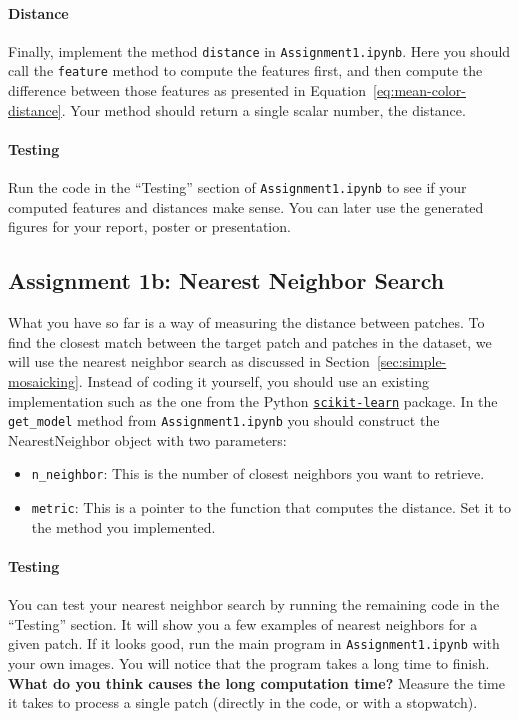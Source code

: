 \documentclass[a4paper]{article}
\begin{document}
		\paragraph{Distance}
		Finally, implement the method \verb|distance| in \verb|Assignment1.ipynb|.
		Here you should call the \verb|feature| method to compute the features first, and then compute the difference between those features as presented in Equation~\ref{eq:mean-color-distance}.
		Your method should return a single scalar number, the distance.
		
		\paragraph{Testing}
		Run the code in the ``Testing'' section of \verb|Assignment1.ipynb| to see if your computed features and distances make sense.
		You can later use the generated figures for your report, poster or presentation.
		
	\subsection{Assignment 1b: Nearest Neighbor Search}
		What you have so far is a way of measuring the distance between patches.
		To find the closest match between the target patch and patches in the dataset, we will use the nearest neighbor search as discussed in Section~\ref{sec:simple-mosaicking}. 
		Instead of coding it yourself, you should use an existing implementation such as the one from the Python 
		\href{http://scikit-learn.org/stable/modules/neighbors.html}{\texttt{scikit-learn}} package.
		In the \verb|get_model| method from \verb|Assignment1.ipynb| you should construct the NearestNeighbor object with two parameters:
		\begin{itemize}
			\item \verb|n_neighbor|: This is the number of closest neighbors you want to retrieve. 
			\item \verb|metric|: This is a pointer to the function that computes the distance. 
			Set it to the method you implemented.
		\end{itemize}
	
		\paragraph{Testing}
		You can test your nearest neighbor search by running the remaining code in the ``Testing'' section.
		It will show you a few examples of nearest neighbors for a given patch.
		If it looks good, run the main program in \verb|Assignment1.ipynb| with your own images.
		You will notice that the program takes a long time to finish. 
		\textbf{What do you think causes the long computation time?}
		Measure the time it takes to process a single patch (directly in the code, or with a stopwatch).
	
\end{document}
